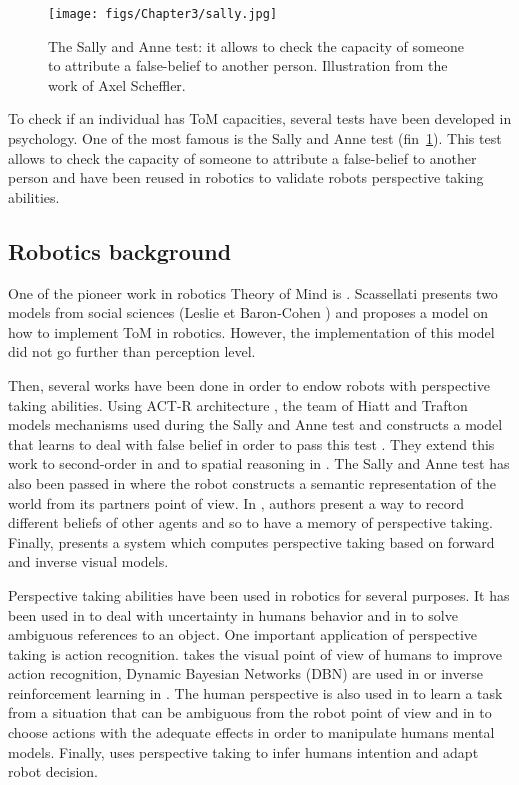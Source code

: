 \documentclass[english,a4paper,11pt,twoside]{StyleThese}
\begin{document}
\begin{figure}[!h]
	\centering
    \texttt{[image: figs/Chapter3/sally.jpg]}
    \caption{The Sally and Anne test: it allows to check the capacity of someone to attribute a false-belief to another person. Illustration from the work of Axel Scheffler.}
    \label{fig:sally}
\end{figure}

To check if an individual has ToM capacities, several tests have been developed in psychology. One of the most famous is the Sally and Anne test (fin~\ref{fig:sally}). This test allows to check the capacity of someone to attribute a false-belief to another person and have been reused in robotics to validate robots perspective taking abilities.

\subsection{Robotics background}

One of the pioneer work in robotics Theory of Mind is \cite{scassellati2002theory}. Scassellati presents two models from social sciences (Leslie \cite{leslie1984spatiotemporal} et Baron-Cohen \cite{baron1997mindblindness}) and proposes a model on how to implement ToM in robotics. However, the implementation of this model did not go further than perception level.

Then, several works have been done in order to endow robots with perspective taking abilities. Using ACT-R architecture \cite{anderson2004integrated}, the team of Hiatt and Trafton models mechanisms used during the Sally and Anne test and constructs a model that learns to deal with false belief in order to pass this test \cite{hiatt2010cognitive}. They extend this work to second-order in \cite{hiatt2015understanding} and to spatial reasoning in \cite{hiatt2004cognitive}. The Sally and Anne test has also been passed in \cite{milliez2014framework} where the robot constructs a semantic representation of the world from its partners point of view. In \cite{berlin2006perspective}, authors present a way to record different beliefs of other agents and so to have a memory of perspective taking. Finally, \cite{johnson2005perspective} presents a system which computes perspective taking based on forward and inverse visual models.

Perspective taking abilities have been used in robotics for several purposes. It has been used in \cite{hiatt2011accommodating} to deal with uncertainty in humans behavior and in \cite{ros2010solving} to solve ambiguous references to an object. One important application of perspective taking is action recognition. \cite{johnson2005perceptual} takes the visual point of view of humans to improve action recognition, Dynamic Bayesian Networks (DBN) are used in \cite{baker2014modeling} or inverse reinforcement learning  in \cite{nagai2015probabilistic}. The human perspective is also used in \cite{breazeal2006using} to learn a task from a situation that can be ambiguous from the robot point of view and in \cite{gray2014manipulating} to choose actions with the adequate effects in order to manipulate humans mental models. Finally, \cite{gorur2017toward} uses perspective taking to infer humans intention and adapt robot decision.
\end{document}
